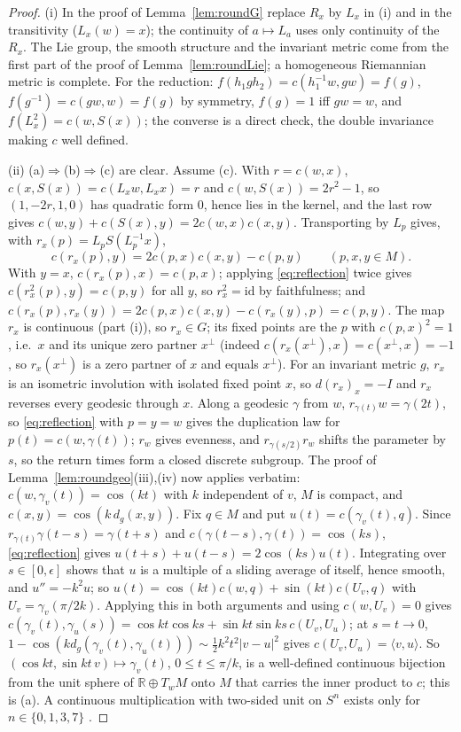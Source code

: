 \documentclass[11pt,reqno]{amsart}
\theoremstyle{definition}
\theoremstyle{remark}
\numberwithin{equation}{section}
\newcommand{\R}{\mathbb{R}}
\newcommand{\ip}[2]{\langle #1,#2\rangle}
\begin{document}
\begin{proof}
(i) In the proof of Lemma~\ref{lem:roundG} replace $R_x$ by $L_x$ in (i) and in the transitivity ($L_x(w)=x$); the continuity of $a\mapsto L_a$
uses only continuity of the $R_x$.  The Lie group, the smooth structure and the invariant metric come from the first part of the proof of
Lemma~\ref{lem:roundLie}; a homogeneous Riemannian metric is complete.  For the reduction: $f(h_1gh_2)=c(h_1^{-1}w,gw)=f(g)$, $f(g^{-1})=c(gw,w)=f(g)$ by
symmetry, $f(g)=1$ iff $gw=w$, and $f(L_x^2)=c(w,S(x))$; the converse is a direct check, the double invariance making $c$ well defined.

(ii) (a)$\Rightarrow$(b)$\Rightarrow$(c) are clear.  Assume (c).  With $r=c(w,x)$, $c(x,S(x))=c(L_xw,L_xx)=r$ and $c(w,S(x))=2r^2-1$, so $(1,-2r,1,0)$ has
quadratic form $0$, hence lies in the kernel, and the last row gives $c(w,y)+c(S(x),y)=2c(w,x)c(x,y)$.  Transporting by $L_p$ gives, with
$r_x(p)=L_pS(L_p^{-1}x)$,
\begin{equation}\label{eq:reflection}
c(r_x(p),y)=2c(p,x)c(x,y)-c(p,y)\qquad(p,x,y\in M).
\end{equation}
With $y=x$, $c(r_x(p),x)=c(p,x)$; applying \eqref{eq:reflection} twice gives $c(r_x^2(p),y)=c(p,y)$ for all $y$, so $r_x^2=\mathrm{id}$ by faithfulness; and
$c(r_x(p),r_x(y))=2c(p,x)c(x,y)-c(r_x(y),p)=c(p,y)$.  The map $r_x$ is continuous (part (i)), so $r_x\in G$; its fixed points are the $p$ with
$c(p,x)^2=1$, i.e.\ $x$ and its unique zero partner $x^\perp$ (indeed $c(r_x(x^\perp),x)=c(x^\perp,x)=-1$, so $r_x(x^\perp)$ is a zero partner of $x$
and equals $x^\perp$).  For an invariant metric $g$, $r_x$ is an isometric involution with isolated fixed point $x$,
so $d(r_x)_x=-I$ and $r_x$ reverses every geodesic through $x$.  Along a geodesic $\gamma$ from $w$, $r_{\gamma(t)}w=\gamma(2t)$, so \eqref{eq:reflection}
with $p=y=w$ gives the duplication law for $p(t)=c(w,\gamma(t))$; $r_w$ gives evenness, and $r_{\gamma(s/2)}r_w$ shifts the parameter by $s$, so the
return times form a closed discrete subgroup.  The proof of Lemma~\ref{lem:roundgeo}(iii),(iv) now applies verbatim: $c(w,\gamma_v(t))=\cos(kt)$ with
$k$ independent of $v$, $M$ is compact, and $c(x,y)=\cos(k\,d_g(x,y))$.  Fix $q\in M$ and put $u(t)=c(\gamma_v(t),q)$.  Since $r_{\gamma(t)}\gamma(t-s)=\gamma(t+s)$ and
$c(\gamma(t-s),\gamma(t))=\cos(ks)$, \eqref{eq:reflection} gives $u(t+s)+u(t-s)=2\cos(ks)u(t)$.  Integrating over $s\in[0,\epsilon]$ shows that $u$ is a
multiple of a sliding average of itself, hence smooth, and $u''=-k^2u$; so $u(t)=\cos(kt)c(w,q)+\sin(kt)c(U_v,q)$ with $U_v=\gamma_v(\pi/2k)$.
Applying this in both arguments and using $c(w,U_v)=0$ gives $c(\gamma_v(t),\gamma_u(s))=\cos kt\cos ks+\sin kt\sin ks\,c(U_v,U_u)$; at $s=t\to0$,
$1-\cos(kd_g(\gamma_v(t),\gamma_u(t)))\sim\frac12k^2t^2\lvert v-u\rvert^2$ gives $c(U_v,U_u)=\ip vu$.  So $(\cos kt,\sin kt\,v)\mapsto\gamma_v(t)$, $0\le t\le\pi/k$, is a
well-defined continuous bijection from the unit sphere of $\R\oplus T_wM$ onto $M$ that carries the inner product to $c$; this is (a).  A
continuous multiplication with two-sided unit on $S^n$ exists only for $n\in\{0,1,3,7\}$ \cite{Adams}.


\end{proof}
\end{document}
